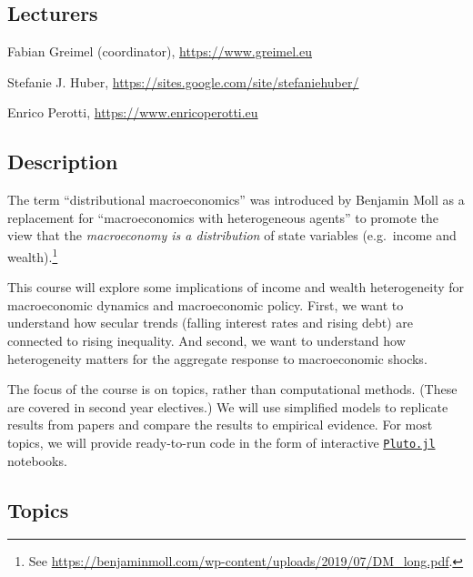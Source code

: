 \documentclass[a4paper,12pt]{article}
\begin{document}

\medskip {}

\subsection*{Lecturers}

Fabian Greimel (coordinator), \url{https://www.greimel.eu}

\noindent
Stefanie J. Huber, \url{https://sites.google.com/site/stefaniehuber/}

\noindent
Enrico Perotti, \url{https://www.enricoperotti.eu}


\subsection*{Description}

The term ``distributional macroeconomics'' was introduced by Benjamin Moll as a replacement for ``macroeconomics with heterogeneous agents'' to promote the view that the \emph{macroeconomy is a distribution} of state variables (e.g.\ income and wealth).\footnote{See \url{ https://benjaminmoll.com/wp-content/uploads/2019/07/DM_long.pdf}.}

This course will explore some implications of income and wealth heterogeneity for macroeconomic dynamics and macroeconomic policy. First, we want to understand how secular trends (falling interest rates and rising debt) are connected to rising inequality. And second, we want to understand how heterogeneity matters for the aggregate response to macroeconomic shocks.

The focus of the course is on topics, rather than computational methods. (These are covered in second year electives.) We will use simplified models to replicate results from papers and compare the results to empirical evidence. For most topics, we will provide ready-to-run code in the form of interactive \href{https://github.com/fonsp/Pluto.jl}{\texttt{Pluto.jl}} notebooks. 


\subsection*{Topics}
\end{document}
